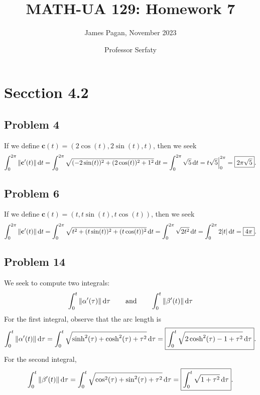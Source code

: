 \documentclass[11pt]{article}
\title{MATH-UA 129: Homework 7}
\author{James Pagan, November 2023}
\date{Professor Serfaty}
\renewcommand{\vec}[1]{\mathbf{#1}}
\begin{document}
\maketitle
\tableofcontents


\section{Secction 4.2}


\subsection*{Problem 4}

If we define $\vec{c}(t) = (2 \cos(t), 2 \sin(t), t)$, then we seek 
\[
	\int_{0}^{2\pi} \norm{\vec{c}'(t)} \dd{t} = \int_{0}^{2\pi} \sqrt{(-2 \sin(t))^{2} + (2 \cos(t))^{2} + 1^{2}} \dd{t} = \int_{0}^{2\pi} \sqrt{5} \dd{t} = t \sqrt{5} \Big|_{0}^{2\pi} = \boxed{2\pi\sqrt{5}}.
\]


\subsection*{Problem 6}

If we define $\vec{c}(t) = (t, t \sin(t), t \cos(t))$, then we seek
\[
	\int_{0}^{2\pi} \norm{\vec{c}'(t)} \dd{t} = \int_{0}^{2\pi} \sqrt{t^{2} + (t \sin(t))^{2} + (t \cos(t))^{2}} \dd{t} = \int_{0}^{2\pi} \sqrt{2t^{2}} \dd{t} = \int_{0}^{2\pi} 2 \abs{t} \dd{t} = \boxed{4\pi}.
\]


\subsection*{Problem 14}

We seek to compute two integrals:
\[
	\int_{0}^{t} \norm{\vec{\alpha}'(\tau)} \dd{\tau} \qquad \text{and} \qquad \int_{0}^{t} \norm{\vec{\beta}'(t)} \dd{\tau} 
\]
For the first integral, observe that the arc length is
\[
	\int_{0}^{t} \norm{\vec{\alpha}'(t)} \dd{\tau} = \int_{0}^{t} \sqrt{\sinh^{2}(\tau) + \cosh^{2}(\tau) + \tau^{2}} \dd{\tau} = \boxed{ \int_{0}^{t} \sqrt{2 \cosh^{2}(\tau) - 1 + \tau^{2}} \dd{\tau}}.
\]
For the second integral,
\[
	\int_{0}^{t} \norm{\vec{\beta}'(t)} \dd{\tau} = \int_{0}^{t} \sqrt{\cos^{2}(\tau) + \sin^{2}(\tau) + \tau^{2}} \dd{\tau} = \boxed{\int_{0}^{t} \sqrt{1 + \tau^{2}} \dd{\tau}}.
\]
\end{document}
